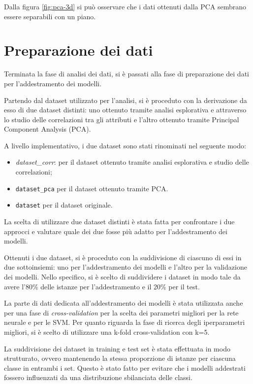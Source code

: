 Dalla figura \ref{fig:pca-3d} si può osservare che i dati ottenuti dalla PCA
sembrano essere separabili con un piano.
\section{Preparazione dei dati} \label{sec:preparazione_dei_dati}
Terminata la fase di analisi dei dati, si è passati alla fase di preparazione
dei dati per l'addestramento dei modelli.

Partendo dal dataset utilizzato per l'analisi, si è proceduto con la derivazione
da esso di due dataset distinti: uno ottenuto tramite analisi esplorativa e
attraverso lo studio delle correlazioni tra gli attributi e l'altro ottenuto
tramite Principal Component Analysis (PCA).

A livello implementativo, i due dataset sono stati rinominati nel seguente modo:
\begin{itemize}
    \item \textit{dataset\_corr}: per il dataset ottenuto tramite analisi
          esplorativa e studio delle correlazioni;
    \item \texttt{dataset\_pca} per il dataset ottenuto tramite PCA.
    \item \texttt{dataset} per il dataset originale.
\end{itemize}

La scelta di utilizzare due dataset distinti è stata fatta per confrontare
i due approcci e valutare quale dei due fosse più adatto per l'addestramento
dei modelli.

Ottenuti i due dataset, si è proceduto con la suddivisione di ciascuno di essi
in due sottoinsiemi: uno per l'addestramento dei modelli e l'altro per la
validazione dei modelli. Nello specifico, si è scelto di suddividere i dataset
in modo tale da avere l'80\% delle istanze per l'addestramento e il 20\% per
il test.

La parte di dati dedicata all'addestramento dei modelli è stata utilizzata anche
per una fase di \textit{cross-validation} per la scelta dei parametri migliori
per la rete neurale e per le SVM. Per quanto riguarda la fase di ricerca degli
iperparametri migliori, si è scelto di utilizzare una k-fold cross-validation
con k=5.

La suddivisione dei dataset in training e test set è stata effettuata in modo
strutturato, ovvero mantenendo la stessa proporzione di istanze per ciascuna
classe in entrambi i set. Questo è stato fatto per evitare che i modelli
addestrati fossero influenzati da una distribuzione sbilanciata delle classi.

